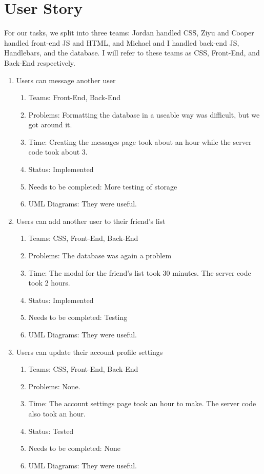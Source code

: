 \documentclass[a4paper]{article}
\begin{document}
\section{User Story}
For our tasks, we split into three teams: Jordan handled CSS, Ziyu and Cooper handled front-end JS and HTML, and Michael and I handled back-end JS, Handlebars, and the database. I will refer to these teams as CSS, Front-End, and Back-End respectively.
\begin{enumerate}

\item Users can message another user
\begin{enumerate}
\item Teams: Front-End, Back-End
\item Problems: Formatting the database in a useable way was difficult, but we got around it.
\item Time: Creating the messages page took about an hour while the server code took about 3.
\item Status: Implemented
\item Needs to be completed: More testing of storage
\item UML Diagrams: They were useful.
\end{enumerate}

\item Users can add another user to their friend’s list
\begin{enumerate}
\item Teams: CSS, Front-End, Back-End
\item Problems: The database was again a problem
\item Time: The modal for the friend’s list took 30 minutes. The server code took 2 hours.
\item Status: Implemented
\item Needs to be completed: Testing
\item UML Diagrams: They were useful.
\end{enumerate}

\item Users can update their account profile settings
\begin{enumerate}
\item Teams: CSS, Front-End, Back-End
\item Problems: None.
\item Time: The account settings page took an hour to make. The server code also took an hour.
\item Status: Tested
\item Needs to be completed: None
\item UML Diagrams: They were useful.
\end{enumerate}

\end{enumerate}
\newpage
\end{document}
